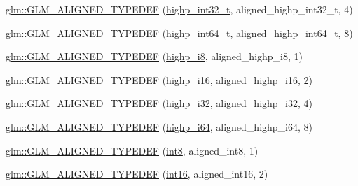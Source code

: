 \begin{DoxyCompactItemize}
\item 
\mbox{\hyperlink{group__gtx__type__aligned_gaae773c28e6390c6aa76f5b678b7098a3}{glm\+::\+G\+L\+M\+\_\+\+A\+L\+I\+G\+N\+E\+D\+\_\+\+T\+Y\+P\+E\+D\+EF}} (\mbox{\hyperlink{group__gtc__type__precision_ga783d077a513c1f475f6cdb406b4238c3}{highp\+\_\+int32\+\_\+t}}, aligned\+\_\+highp\+\_\+int32\+\_\+t, 4)
\item 
\mbox{\hyperlink{group__gtx__type__aligned_ga790cfff1ca39d0ed696ffed980809311}{glm\+::\+G\+L\+M\+\_\+\+A\+L\+I\+G\+N\+E\+D\+\_\+\+T\+Y\+P\+E\+D\+EF}} (\mbox{\hyperlink{group__gtc__type__precision_ga0f5186bde44471133b08057cae8a51ac}{highp\+\_\+int64\+\_\+t}}, aligned\+\_\+highp\+\_\+int64\+\_\+t, 8)
\item 
\mbox{\hyperlink{group__gtx__type__aligned_ga8265b91eb23c120a9b0c3e381bc37b96}{glm\+::\+G\+L\+M\+\_\+\+A\+L\+I\+G\+N\+E\+D\+\_\+\+T\+Y\+P\+E\+D\+EF}} (\mbox{\hyperlink{group__gtc__type__precision_ga8b9eb0b24cce7f14478bfcacb53ce839}{highp\+\_\+i8}}, aligned\+\_\+highp\+\_\+i8, 1)
\item 
\mbox{\hyperlink{group__gtx__type__aligned_gae6d384de17588d8edb894fbe06e0d410}{glm\+::\+G\+L\+M\+\_\+\+A\+L\+I\+G\+N\+E\+D\+\_\+\+T\+Y\+P\+E\+D\+EF}} (\mbox{\hyperlink{group__gtc__type__precision_gaa04399853952dbce29cb62e2432f350a}{highp\+\_\+i16}}, aligned\+\_\+highp\+\_\+i16, 2)
\item 
\mbox{\hyperlink{group__gtx__type__aligned_ga9c8172b745ee03fc5b2b91c350c2922f}{glm\+::\+G\+L\+M\+\_\+\+A\+L\+I\+G\+N\+E\+D\+\_\+\+T\+Y\+P\+E\+D\+EF}} (\mbox{\hyperlink{group__gtc__type__precision_ga197d19b585222da57d70238a5cfc2be8}{highp\+\_\+i32}}, aligned\+\_\+highp\+\_\+i32, 4)
\item 
\mbox{\hyperlink{group__gtx__type__aligned_ga77e0dff12aa4020ddc3f8cabbea7b2e6}{glm\+::\+G\+L\+M\+\_\+\+A\+L\+I\+G\+N\+E\+D\+\_\+\+T\+Y\+P\+E\+D\+EF}} (\mbox{\hyperlink{group__gtc__type__precision_gad3cb9a0ac0266ea2c51c6fac256345d1}{highp\+\_\+i64}}, aligned\+\_\+highp\+\_\+i64, 8)
\item 
\mbox{\hyperlink{group__gtx__type__aligned_gabd82b9faa9d4d618dbbe0fc8a1efee63}{glm\+::\+G\+L\+M\+\_\+\+A\+L\+I\+G\+N\+E\+D\+\_\+\+T\+Y\+P\+E\+D\+EF}} (\mbox{\hyperlink{group__gtc__type__precision_ga96254f9c1c4506fc8eb5cf3301ce8565}{int8}}, aligned\+\_\+int8, 1)
\item 
\mbox{\hyperlink{group__gtx__type__aligned_ga285649744560be21000cfd81bbb5d507}{glm\+::\+G\+L\+M\+\_\+\+A\+L\+I\+G\+N\+E\+D\+\_\+\+T\+Y\+P\+E\+D\+EF}} (\mbox{\hyperlink{group__gtc__type__precision_ga2945a61d12771f8954994fcddf02b021}{int16}}, aligned\+\_\+int16, 2)

\end{DoxyCompactItemize}
